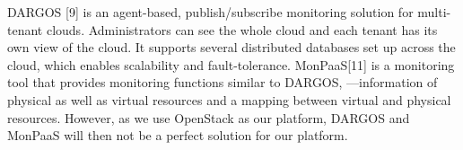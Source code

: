 DARGOS [9] is an agent-based, publish/subscribe monitoring solution for multi-tenant clouds. Administrators can see the whole cloud and each tenant has its own view of the cloud. It supports several distributed databases set up across the cloud, which enables scalability and fault-tolerance. MonPaaS[11] is a monitoring tool that provides monitoring functions similar to DARGOS, —information of physical as well as virtual resources and a mapping between virtual and physical resources. However, as we use OpenStack as our platform, DARGOS and MonPaaS will then not be a perfect solution for our  platform.